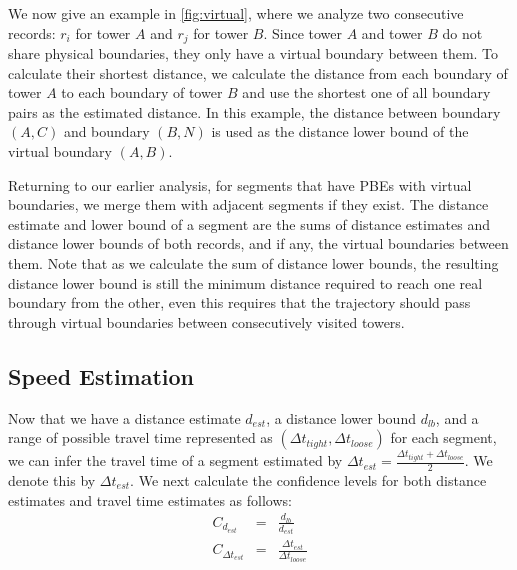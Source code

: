 We now give an example in \autoref{fig:virtual}, where we analyze two consecutive records: $r_i$ for tower $A$ and $r_j$ for tower $B$. Since tower $A$ and tower $B$ do not share physical boundaries, they only have a virtual boundary between them. To calculate their shortest distance, we calculate the distance from each boundary of tower $A$ to each boundary of tower $B$ and use the shortest one of all boundary pairs as the estimated distance. In this example, the distance between boundary $(A, C)$ and boundary $(B, N)$ is used as the distance lower bound of the virtual boundary $(A, B)$.


Returning to our earlier analysis, for segments that have PBEs with virtual boundaries, we merge them with adjacent segments if they exist. The distance estimate and lower bound of a segment are the sums of distance estimates and distance lower bounds of both records, and if any, the virtual boundaries between them. Note that as we calculate the sum of distance lower bounds, the resulting distance lower bound is still the minimum distance required to reach one real boundary from the other, even this requires that the trajectory should pass through virtual boundaries  between consecutively visited towers.

\subsection{Speed Estimation}

Now that we have a distance estimate $d_{est}$, a distance lower bound $d_{lb}$, and a range of possible travel time represented as $(\Delta t_{tight}, \Delta t_{loose})$ for each segment, we can infer the travel time of a segment estimated by $\Delta t_{est} = \frac{\Delta t_{tight} + \Delta t_{loose}}{2}$. We denote this by $\Delta t_{est}$. We next calculate the confidence levels for both distance estimates and travel time estimates as follows:
\begin{eqnarray}
  C_{d_{est}} &=& \frac{d_{lb}}{d_{est}} \\
  C_{\Delta t_{est}} &=& \frac{\Delta t_{est}}{\Delta t_{loose}}
\end{eqnarray}

